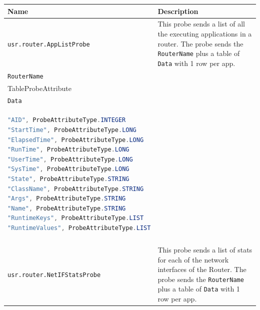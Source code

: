 {
  \small

  \begin{longtable}{ | p{5.7cm} | p{8.7cm} | }

\hline
\textbf{Name} & \textbf{Description} \\
\hline
\texttt{usr.router.AppListProbe} & This probe sends a list of all the executing
applications in a router. \newline
The probe sends the \texttt{RouterName} plus
a table of \texttt{Data} with 1 row per app.

\vspace{\baselineskip}
\begin{tabular}{ p{8.3cm} }
  \hline
  ProbeAttributeType.STRING \\
  \hline
  \texttt{RouterName} \\
  \hline
  TableProbeAttribute \\
  \hline
  \texttt{Data} \\
  \hline 
\begin{lstlisting}[language=java] 
"AID", ProbeAttributeType.INTEGER
"StartTime", ProbeAttributeType.LONG
"ElapsedTime", ProbeAttributeType.LONG
"RunTime", ProbeAttributeType.LONG
"UserTime", ProbeAttributeType.LONG
"SysTime", ProbeAttributeType.LONG
"State", ProbeAttributeType.STRING
"ClassName", ProbeAttributeType.STRING
"Args", ProbeAttributeType.STRING
"Name", ProbeAttributeType.STRING
"RuntimeKeys", ProbeAttributeType.LIST
"RuntimeValues", ProbeAttributeType.LIST
\end{lstlisting} \\
  \hline
\end{tabular}

\\
\hline
\texttt{usr.router.NetIFStatsProbe} & This probe sends a list of stats
for each of the network interfaces of the Router. \newline
The probe sends the \texttt{RouterName} plus
a table of \texttt{Data} with 1 row per app.


\end{longtable}}
